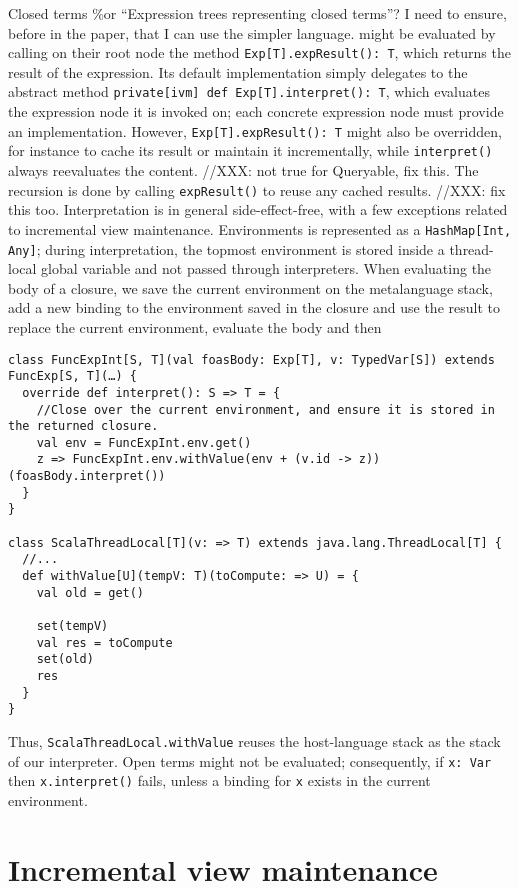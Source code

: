 \documentclass[preprint,authoryear,10pt]{sigplanconf}
\begin{document}
Closed terms \%or ``Expression trees representing closed terms''? I need
to ensure, before in the paper, that I can use the simpler language.
might be evaluated by calling on their root node the method
\texttt{Exp{[}T{]}.expResult(): T}, which returns the result of the
expression. Its default implementation simply delegates to the abstract
method \texttt{private{[}ivm{]} def Exp{[}T{]}.interpret(): T}, which
evaluates the expression node it is invoked on; each concrete expression
node must provide an implementation. However,
\texttt{Exp{[}T{]}.expResult(): T} might also be overridden, for
instance to cache its result or maintain it incrementally, while
\texttt{interpret()} always reevaluates the content. //XXX: not true for
Queryable, fix this. The recursion is done by calling
\texttt{expResult()} to reuse any cached results. //XXX: fix this too.
Interpretation is in general side-effect-free, with a few exceptions
related to incremental view maintenance. Environments is represented as
a \texttt{HashMap{[}Int, Any{]}}; during interpretation, the topmost
environment is stored inside a thread-local global variable and not
passed through interpreters. When evaluating the body of a closure, we
save the current environment on the metalanguage stack, add a new
binding to the environment saved in the closure and use the result to
replace the current environment, evaluate the body and then

\begin{verbatim}
class FuncExpInt[S, T](val foasBody: Exp[T], v: TypedVar[S]) extends FuncExp[S, T](…) {
  override def interpret(): S => T = {
    //Close over the current environment, and ensure it is stored in the returned closure.
    val env = FuncExpInt.env.get()
    z => FuncExpInt.env.withValue(env + (v.id -> z))(foasBody.interpret())
  }
}

class ScalaThreadLocal[T](v: => T) extends java.lang.ThreadLocal[T] {
  //...
  def withValue[U](tempV: T)(toCompute: => U) = {
    val old = get()

    set(tempV)
    val res = toCompute
    set(old)
    res
  }
}
\end{verbatim}
Thus,
\texttt{ScalaThreadLocal.withValue} reuses the host-language stack as
the stack of our interpreter. Open terms might not be evaluated;
consequently, if \texttt{x: Var} then \texttt{x.interpret()} fails,
unless a binding for \texttt{x} exists in the current environment.

\section{Incremental view maintenance}
\end{document}
